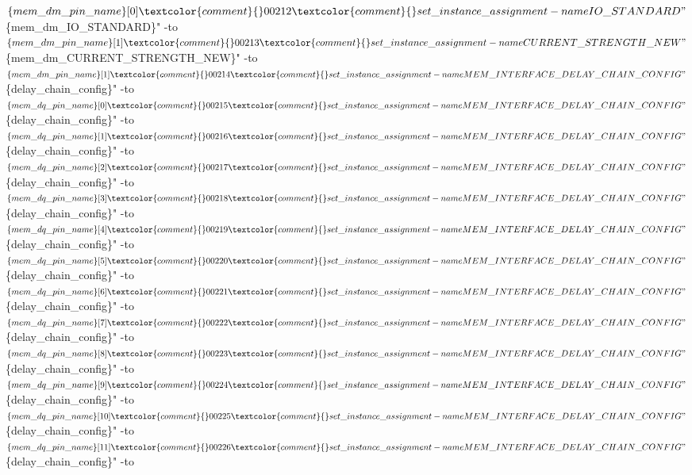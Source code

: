 \begin{DoxyCode}
      $\{mem\_dm\_pin\_name\}[0]\textcolor{comment}{}
00212 \textcolor{comment}{}set\_instance\_assignment -name IO\_STANDARD "$\{mem\_dm\_IO\_STANDARD\}" -to $\{mem\_dm\_pin\_name\}[1]\textcolor{comment}{}
00213 \textcolor{comment}{}set\_instance\_assignment -name CURRENT\_STRENGTH\_NEW "$\{mem\_dm\_CURRENT\_STRENGTH\_NEW\}" -to 
      $\{mem\_dm\_pin\_name\}[1]\textcolor{comment}{}
00214 \textcolor{comment}{}set\_instance\_assignment -name MEM\_INTERFACE\_DELAY\_CHAIN\_CONFIG "$\{delay\_chain\_config\}" -to 
      $\{mem\_dq\_pin\_name\}[0]\textcolor{comment}{}
00215 \textcolor{comment}{}set\_instance\_assignment -name MEM\_INTERFACE\_DELAY\_CHAIN\_CONFIG "$\{delay\_chain\_config\}" -to 
      $\{mem\_dq\_pin\_name\}[1]\textcolor{comment}{}
00216 \textcolor{comment}{}set\_instance\_assignment -name MEM\_INTERFACE\_DELAY\_CHAIN\_CONFIG "$\{delay\_chain\_config\}" -to 
      $\{mem\_dq\_pin\_name\}[2]\textcolor{comment}{}
00217 \textcolor{comment}{}set\_instance\_assignment -name MEM\_INTERFACE\_DELAY\_CHAIN\_CONFIG "$\{delay\_chain\_config\}" -to 
      $\{mem\_dq\_pin\_name\}[3]\textcolor{comment}{}
00218 \textcolor{comment}{}set\_instance\_assignment -name MEM\_INTERFACE\_DELAY\_CHAIN\_CONFIG "$\{delay\_chain\_config\}" -to 
      $\{mem\_dq\_pin\_name\}[4]\textcolor{comment}{}
00219 \textcolor{comment}{}set\_instance\_assignment -name MEM\_INTERFACE\_DELAY\_CHAIN\_CONFIG "$\{delay\_chain\_config\}" -to 
      $\{mem\_dq\_pin\_name\}[5]\textcolor{comment}{}
00220 \textcolor{comment}{}set\_instance\_assignment -name MEM\_INTERFACE\_DELAY\_CHAIN\_CONFIG "$\{delay\_chain\_config\}" -to 
      $\{mem\_dq\_pin\_name\}[6]\textcolor{comment}{}
00221 \textcolor{comment}{}set\_instance\_assignment -name MEM\_INTERFACE\_DELAY\_CHAIN\_CONFIG "$\{delay\_chain\_config\}" -to 
      $\{mem\_dq\_pin\_name\}[7]\textcolor{comment}{}
00222 \textcolor{comment}{}set\_instance\_assignment -name MEM\_INTERFACE\_DELAY\_CHAIN\_CONFIG "$\{delay\_chain\_config\}" -to 
      $\{mem\_dq\_pin\_name\}[8]\textcolor{comment}{}
00223 \textcolor{comment}{}set\_instance\_assignment -name MEM\_INTERFACE\_DELAY\_CHAIN\_CONFIG "$\{delay\_chain\_config\}" -to 
      $\{mem\_dq\_pin\_name\}[9]\textcolor{comment}{}
00224 \textcolor{comment}{}set\_instance\_assignment -name MEM\_INTERFACE\_DELAY\_CHAIN\_CONFIG "$\{delay\_chain\_config\}" -to 
      $\{mem\_dq\_pin\_name\}[10]\textcolor{comment}{}
00225 \textcolor{comment}{}set\_instance\_assignment -name MEM\_INTERFACE\_DELAY\_CHAIN\_CONFIG "$\{delay\_chain\_config\}" -to 
      $\{mem\_dq\_pin\_name\}[11]\textcolor{comment}{}
00226 \textcolor{comment}{}set\_instance\_assignment -name MEM\_INTERFACE\_DELAY\_CHAIN\_CONFIG "$\{delay\_chain\_config\}" -to 

\end{DoxyCode}
